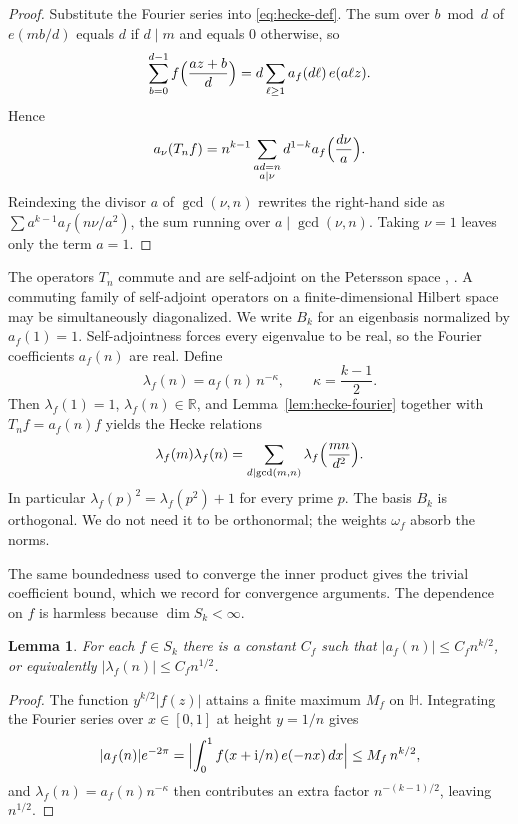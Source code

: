 \documentclass[11pt]{amsart}
\newtheorem{lemma}[theorem]{Lemma}
\theoremstyle{definition}
\theoremstyle{remark}
\numberwithin{equation}{section}
\newcommand{\HH}{\mathbb{H}}
\newcommand{\RR}{\mathbb{R}}
\newcommand{\ii}{\mathrm{i}}
\begin{document}
\begin{proof}
Substitute the Fourier series into \eqref{eq:hecke-def}. The sum over $b\bmod d$ of $e(mb/d)$ equals $d$ if $d\mid m$ and equals $0$ otherwise, so
\[
\sum_{b=0}^{d-1}f\Bigl(\frac{az+b}{d}\Bigr)
=d\sum_{\ell\ge 1}a_f(d\ell)\,e(a\ell z).
\]
Hence
\[
a_\nu(T_nf)
=n^{k-1}\sum_{\substack{ad=n\\ a\mid\nu}}d^{1-k}a_f\Bigl(\frac{d\nu}{a}\Bigr).
\]
Reindexing the divisor $a$ of $\gcd(\nu,n)$ rewrites the right-hand side as $\sum a^{k-1}a_f(n\nu/a^2)$, the sum running over $a\mid\gcd(\nu,n)$. Taking $\nu=1$ leaves only the term $a=1$.
\end{proof}

The operators $T_n$ commute and are self-adjoint on the Petersson space \cite[Chapter~3]{Shimura1971}, \cite[Chapter~6]{Iwaniec1997}. A commuting family of self-adjoint operators on a finite-dimensional Hilbert space may be simultaneously diagonalized. We write $B_k$ for an eigenbasis normalized by $a_f(1)=1$. Self-adjointness forces every eigenvalue to be real, so the Fourier coefficients $a_f(n)$ are real. Define
\begin{equation}\label{eq:lambda-def}
\lambda_f(n)=a_f(n)\,n^{-\kappa},\qquad\kappa=\frac{k-1}{2}.
\end{equation}
Then $\lambda_f(1)=1$, $\lambda_f(n)\in\RR$, and Lemma~\ref{lem:hecke-fourier} together with $T_nf=a_f(n)f$ yields the Hecke relations
\begin{equation}\label{eq:hecke-mult}
\lambda_f(m)\lambda_f(n)=\sum_{d\mid\gcd(m,n)}\lambda_f\Bigl(\frac{mn}{d^2}\Bigr).
\end{equation}
In particular $\lambda_f(p)^2=\lambda_f(p^2)+1$ for every prime $p$. The basis $B_k$ is orthogonal. We do not need it to be orthonormal; the weights $\omega_f$ absorb the norms.

The same boundedness used to converge the inner product gives the trivial coefficient bound, which we record for convergence arguments. The dependence on $f$ is harmless because $\dim S_k<\infty$.

\begin{lemma}\label{lem:trivial-coeff}
For each $f\in S_k$ there is a constant $C_f$ such that $\lvert a_f(n)\rvert\le C_f n^{k/2}$, or equivalently $\lvert\lambda_f(n)\rvert\le C_f n^{1/2}$.
\end{lemma}

\begin{proof}
The function $y^{k/2}\lvert f(z)\rvert$ attains a finite maximum $M_f$ on $\HH$. Integrating the Fourier series over $x\in[0,1]$ at height $y=1/n$ gives
\[
\lvert a_f(n)\rvert e^{-2\pi}
=\Bigl\lvert\int_0^1 f(x+\ii/n)\,e(-nx)\,dx\Bigr\rvert
\le M_f\, n^{k/2},
\]
and $\lambda_f(n)=a_f(n)n^{-\kappa}$ then contributes an extra factor $n^{-(k-1)/2}$, leaving $n^{1/2}$.
\end{proof}
\end{document}
